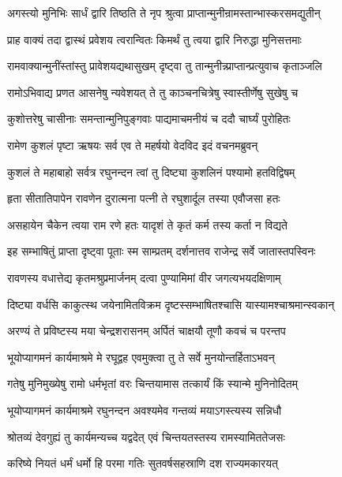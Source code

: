\twolineshloka
{अगस्त्यो मुनिभिः सार्धं द्वारि तिष्ठति ते नृप}
{श्रुत्वा प्राप्तान्मुनीन्रामस्तान्भास्करसमद्युतीन्}%

\twolineshloka
{प्राह वाक्यं तदा द्वास्थं प्रवेशय त्वरान्वितः}
{किमर्थं तु त्वया द्वारि निरुद्धा मुनिसत्तमाः}%

\twolineshloka
{रामवाक्यान्मुनींस्तांस्तु प्रावेशयद्यथासुखम्}
{दृष्ट्वा तु तान्मुनीन्न्प्राप्तान्प्रत्युवाच कृताञ्जलि}%

\twolineshloka
{रामोऽभिवाद्य प्रणत आसनेषु न्यवेशयत्}
{ते तु काञ्चनचित्रेषु स्वास्तीर्णेषु सुखेषु च}%

\twolineshloka
{कुशोत्तरेषु चासीनाः समन्तान्मुनिपुङ्गवाः}
{पाद्यमाचमनीयं च ददौ चार्घ्यं पुरोहितः}%

\twolineshloka
{रामेण कुशलं पृष्टा ऋषयः सर्व एव ते}
{महर्षयो वेदविद इदं वचनमब्रुवन्}%

\twolineshloka
{कुशलं ते महाबाहो सर्वत्र रघुनन्दन}
{त्वां तु दिष्ट्या कुशलिनं पश्यामो हतविद्विषम्}%

\twolineshloka
{हृता सीतातिपापेन रावणेन दुरात्मना}
{पत्नी ते रघुशार्दूल तस्या एवौजसा हतः}%

\twolineshloka
{असहायेन चैकेन त्वया राम रणे हतः}
{यादृशं ते कृतं कर्म तस्य कर्ता न विद्यते}%

\twolineshloka
{इह सम्भाषितुं प्राप्ता दृष्ट्वा पूताः स्म साम्प्रतम्}
{दर्शनात्तव राजेन्द्र सर्वे जातास्तपस्विनः}%

\twolineshloka
{रावणस्य वधात्तेद्य कृतमश्रुप्रमार्जनम्}
{दत्वा पुण्यामिमां वीर जगत्यभयदक्षिणाम्}%

\twolineshloka
{दिष्ट्या वर्धसि काकुत्स्थ जयेनामितविक्रम}
{दृष्टस्सम्भाषितश्चासि यास्यामश्चाश्रमान्स्वकान्}%

\twolineshloka
{अरण्यं ते प्रविष्टस्य मया चेन्द्रशरासनम्}
{अर्पितं चाक्षयौ तूणौ कवचं च परन्तप}%

\twolineshloka
{भूयोप्यागमनं कार्यमाश्रमे मे रघूद्वह}
{एवमुक्त्वा तु ते सर्वे मुनयोन्तर्हिताऽभवन्}%

\twolineshloka
{गतेषु मुनिमुख्येषु रामो धर्मभृतां वरः}
{चिन्तयामास तत्कार्यं किं स्यान्मे मुनिनोदितम्}%

\twolineshloka
{भूयोप्यागमनं कार्यमाश्रमे रघुनन्दन}
{अवश्यमेव गन्तव्यं मयाऽगस्त्यस्य सन्निधौ}%

\twolineshloka
{श्रोतव्यं देवगुह्यं तु कार्यमन्यच्च यद्वदेत्}
{एवं चिन्तयतस्तस्य रामस्यामिततेजसः}%

\twolineshloka
{करिष्ये नियतं धर्मं धर्मो हि परमा गतिः}
{सुतवर्षसहस्राणि दश राज्यमकारयत्}%


